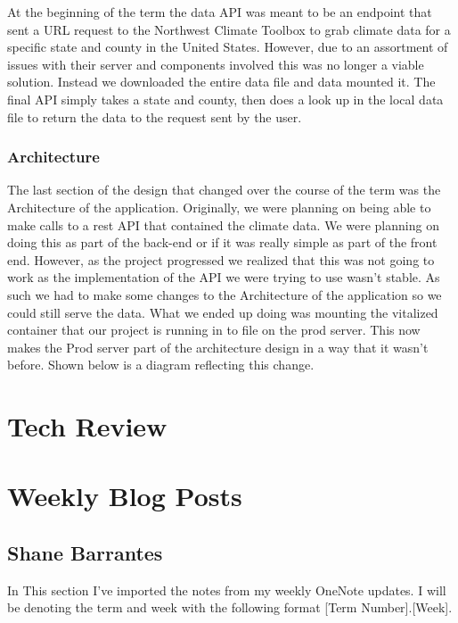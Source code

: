 \documentclass[onecolumn, draftclsnofoot,10pt, compsoc]{article}
\begin{document}
        At the beginning of the term the data API was meant to be an endpoint that sent a URL request to the Northwest Climate Toolbox to grab climate data for a specific state and county in the United States. However, due to an assortment of issues with their server and components involved this was no longer a viable solution. Instead we downloaded the entire data file and data mounted it. The final API simply takes a state and county, then does a look up in the local data file to return the data to the request sent by the user.

        \subsubsection{Architecture}
        The last section of the design that changed over the course of the term was the Architecture of the application. Originally, we were planning on being able to make calls to a rest API that contained the climate data. We were planning on doing this as part of the back-end or if it was really simple as part of the front end. However, as the project progressed we realized that this was not going to work as the implementation of the API we were trying to use wasn't stable. As such we had to make some changes to the Architecture of the application so we could still serve the data. What we ended up doing was mounting the vitalized container that our project is running in to file on the prod server. This now makes the Prod server part of the architecture design in a way that it wasn't before. Shown below is a diagram reflecting this change.\\
        
        

\section{Tech Review}
	

\section{Weekly Blog Posts}
    \subsection{Shane Barrantes}
        In This section I've imported the notes from my weekly OneNote updates. I will be denoting the term and week with the following format [Term Number].[Week].
\end{document}
